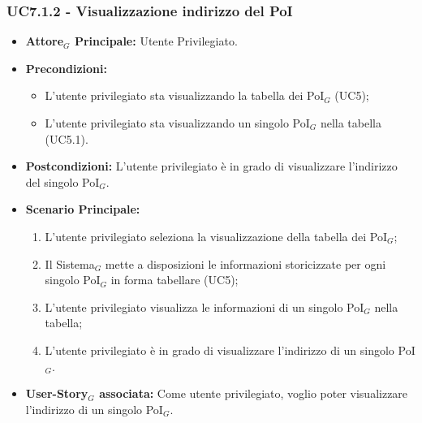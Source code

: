 \documentclass[10pt]{article}
\begin{document}
\begin{justify}
\subsubsection{\textbf{UC7.1.2 - Visualizzazione indirizzo del PoI}}
\label{UC7.1.2}
\begin{itemize}
    \item \textbf{Attore$_G$ Principale:} Utente Privilegiato.
    \item \textbf{Precondizioni:} 
        \begin{itemize}
          \item L'utente privilegiato sta visualizzando la tabella dei PoI$_G$ (UC5);
            \item L'utente privilegiato sta visualizzando un singolo PoI$_G$ nella tabella (UC5.1).
        \end{itemize}
      \item \textbf{Postcondizioni:} L'utente privilegiato è in grado di visualizzare l'indirizzo del singolo PoI$_G$.
    \item \textbf{Scenario Principale:} 
        \begin{enumerate}
        \item L'utente privilegiato seleziona la visualizzazione della tabella dei PoI$_G$;
          \item Il Sistema$_G$ mette a disposizioni le informazioni storicizzate per ogni singolo PoI$_G$ in forma tabellare (UC5);
          \item L'utente privilegiato visualizza le informazioni di un singolo PoI$_G$ nella tabella;
            \item L'utente privilegiato è in grado di visualizzare l'indirizzo di un singolo PoI$_G$.
        \end{enumerate}
    \item \textbf{User-Story$_G$ associata:} Come utente privilegiato, voglio poter visualizzare l'indirizzo di un singolo PoI$_G$.
\end{itemize}

\end{justify}
\end{document}
